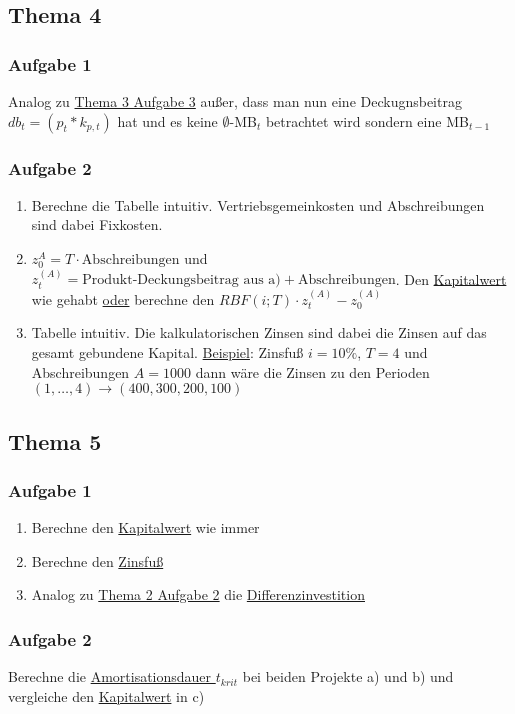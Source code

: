 	\subsection*{Thema 4}
		\subsubsection*{Aufgabe 1}
		Analog zu \hyperref[Thema3Aufgabe3]{Thema 3 Aufgabe 3} außer, dass man nun eine Deckugnsbeitrag $db_t=(p_t*k_{p,t})$ hat und es keine $\emptyset$-MB$_t$ betrachtet wird sondern eine MB$_{t-1}$
		
		\subsubsection*{Aufgabe 2}
		\begin{enumerate}[label=\alph*)]
			\item Berechne die Tabelle intuitiv. Vertriebsgemeinkosten und Abschreibungen sind dabei Fixkosten.
			\item $z_0^{A}=T\cdot \text{Abschreibungen}$ und $z_t^{(A)}=\text{Produkt-Deckungsbeitrag aus a)} + \text{Abschreibungen}$. Den \hyperref[Kapitalwert]{Kapitalwert} wie gehabt \underline{oder} berechne den $RBF(i;T) \cdot z_t^{(A)}- z_0^{(A)}$
			\item Tabelle intuitiv. Die kalkulatorischen Zinsen sind dabei die Zinsen auf das gesamt gebundene Kapital. \underline{Beispiel}: Zinsfuß $i=10\%$, $T=4$ und Abschreibungen $A = 1000$ dann wäre die Zinsen zu den Perioden $(1,\dots,4) \rightarrow (400, 300, 200 , 100)$
		\end{enumerate}
	\subsection*{Thema 5}
	\subsubsection*{Aufgabe 1}
	\begin{enumerate}[label=\alph*)]
		\item Berechne den \hyperref[Kapitalwert]{Kapitalwert} wie immer
		\item Berechne den \hyperref[Zinsfuss]{Zinsfuß}
		\item Analog zu \hyperref[Thema2Aufgabe2]{Thema 2 Aufgabe 2} die \hyperref[Differenzinvestition]{Differenzinvestition}
	\end{enumerate}

	\subsubsection*{Aufgabe 2}
	Berechne die \hyperref[Amortisationsdauer]{Amortisationsdauer $t_{krit}$} bei beiden Projekte a) und b) und vergleiche den \hyperref[Kapitalwert]{Kapitalwert} in c)
	
